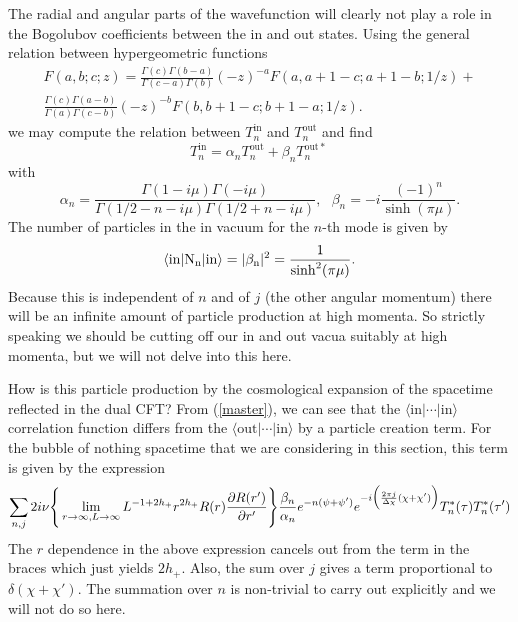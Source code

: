 \documentclass[a4paper,aps,prd,preprintnumbers,groupedaddress]{revtex4}
\begin{document}
The radial and angular parts of the wavefunction will clearly not play a role in the Bogolubov coefficients between the in and out states. Using the general relation between hypergeometric functions \cite{as}
\begin{eqnarray}
F(a,b;c;z) = \frac{ \Gamma(c) \Gamma(b-a)}{ \Gamma(c-a) \Gamma(b)} (-z)^{-a} F(a,a+1-c;a+1-b;1/z) + \nonumber \\
\frac{\Gamma(c) \Gamma(a-b)} {\Gamma(a) \Gamma(c-b)} (-z)^{-b} F(b,b+1-c;b+1-a;1/z) .
\end{eqnarray}
we may compute the relation between $T^{\mathrm{in}} _n$ and $T^{\mathrm{{out}}} _n$ and find
\begin{equation}
T^{\mathrm{in}} _n = \alpha _n T ^{\mathrm{{out}}} _n + \beta_n T^{\mathrm{{out}}*} _n\,
\end{equation}
with
\begin{equation}
\alpha_n= \frac{\Gamma(1-i\mu)\Gamma(-i\mu)}{\Gamma(1/2-n-i\mu)\Gamma(1/2+n-i\mu)} , \ \ \ \beta_n=-i \frac{(-1)^n}{\sinh(\pi \mu)} .
\end{equation}
The number of particles in the in vacuum for the $n$-th mode is given by
\begin{equation}
\langle \rm{in}| N_n | \mathrm{\rm{in}} \rangle = |\beta_n|^2 = \frac{1}{\sinh ^2 (\pi \mu) } .
\end{equation}
Because this is independent of $n$ and of $j$ (the other angular momentum) there will be an infinite amount of particle production at high momenta.  So strictly speaking we should be cutting off our in and out vacua suitably at high momenta, but we will not delve into this here.

How is this particle production by the cosmological expansion of the spacetime reflected in the dual CFT?
From (\ref{master}), we can see that the  $\langle \mathrm{in}| \cdots |\mathrm{in} \rangle $ correlation function differs from the $\langle \mathrm{out} | \cdots |\mathrm{in} \rangle $ by a particle creation term.  For the bubble of nothing spacetime that we are considering in this section, this term is given by the expression
\begin{equation}
\sum_{n,j}
2 i \nu \Bigg\{ \lim_{r \rightarrow \infty,  L \rightarrow \infty} L^{-1+2h_+} r^{2h_{+}} R(r) \frac{\partial R(r')}{\partial r'} \Bigg\}
\frac{\beta_n}{\alpha_n} e^{-n(\psi + \psi')}e^{-i\Bigl({\frac{2\pi j} {\Delta \chi}}(\chi+\chi')\Bigr)}T^*_n(\tau)T^*_n(\tau')
\end{equation}
The $r$ dependence in the above expression cancels out from the term in the braces which just yields $2h_+$. Also, the sum over $j$  gives a term proportional to $\delta(\chi+\chi')$. The summation over $n$ is non-trivial to carry out explicitly and we will not do so here.
\end{document}
